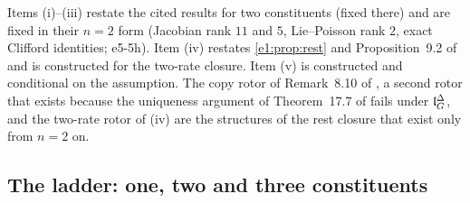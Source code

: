 Items (i)--(iii) restate the cited results for two constituents (fixed there) and are fixed in their $n=2$ form (Jacobian rank $11$ and $5$, Lie--Poisson
rank $2$, exact Clifford identities; e5-5h). Item (iv) restates \cref{e1:prop:rest} and Proposition~9.2 of \cite{RE} and is constructed for the two-rate
closure. Item (v) is constructed and conditional on the assumption. The copy rotor of Remark~8.10 of \cite{RE}, a second rotor that exists because the
uniqueness argument of Theorem~17.7 of \cite{ES17} fails under $\mathfrak l_G^\Delta$, and the two-rate rotor of (iv) are the structures of the rest closure that exist only from $n=2$ on.

\subsection{The ladder: one, two and three constituents}
\label{e5:sec:ladder}

